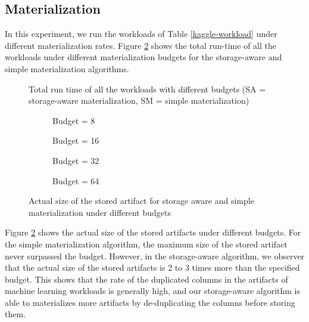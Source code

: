 \subsection{Materialization}
In this experiment, we run the workloads of Table \ref{kaggle-workload} under different materialization rates.
Figure \ref{exp-sa-vs-simple-size} shows the total run-time of all the workloads under different materialization budgets for the storage-aware and simple materialization algorithms.
\begin{figure}
\centering
 \resizebox{0.5\columnwidth}{!}{%
%
}
\caption{Total run time of all the workloads with different budgets (SA = storage-aware materialization, SM = simple materialization)}
\label{exp-runtime-vs-mat-budget}
\end{figure}

\begin{figure}
\begin{subfigure}[b]{0.5\linewidth}
\centering
 \resizebox{\columnwidth}{!}{%
%
}
\caption{Budget = 8}
\end{subfigure}%
\begin{subfigure}[b]{0.5\linewidth}
\centering
 \resizebox{\columnwidth}{!}{%
%
}

\caption{Budget = 16}
\end{subfigure}
\begin{subfigure}[b]{0.5\linewidth}
\centering
 \resizebox{\columnwidth}{!}{%
%
}

\caption{Budget = 32}
\end{subfigure}%
\begin{subfigure}[b]{0.5\linewidth}
\centering
 \resizebox{\columnwidth}{!}{%
%
}
\caption{Budget = 64}
\end{subfigure}
\caption{Actual size of the stored artifact for storage aware and simple materialization under different budgets }
\label{exp-sa-vs-simple-size}
\end{figure}
Figure \ref{exp-sa-vs-simple-size}  shows the actual size of the stored artifacts under different budgets.
For the simple materialization algorithm, the maximum size of the stored artifact never surpassed the budget.
However, in the storage-aware algorithm, we observer that the actual size of the stored artifacts is 2 to 3 times more than the specified budget.
This shows that the rate of the duplicated columns in the artifacts of machine learning workloads is generally high, and our storage-aware algorithm is able to materializes more artifacts by de-duplicating the columns before storing them.

